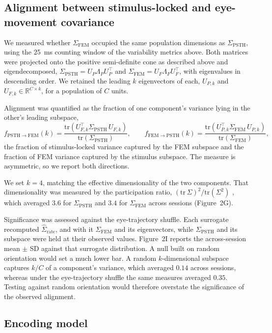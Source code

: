 \documentclass{lite}
\newcommand{\Cpsth}{\Sigma_{\text{PSTH}}}
\newcommand{\Cfem}{\Sigma_{\text{FEM}}}
\begin{document}
\subsection{Alignment between stimulus-locked and eye-movement covariance}
We measured whether $\Cfem$ occupied the same population dimensions as $\Cpsth$, using the 25~ms counting window of the variability metrics above. Both matrices were projected onto the positive semi-definite cone as described above and eigendecomposed, $\Cpsth = U_P \Lambda_P U_P^\top$ and $\Cfem = U_F \Lambda_F U_F^\top$, with eigenvalues in descending order. We retained the leading $k$ eigenvectors of each, $U_{P,k}$ and $U_{F,k} \in \mathbb{R}^{C \times k}$, for a population of $C$ units.

Alignment was quantified as the fraction of one component's variance lying in the other's leading subspace,
\begin{equation}
f_{\mathrm{PSTH}\to\mathrm{FEM}}(k)=\frac{\mathrm{tr}\!\left(U_{F,k}^\top \Cpsth\, U_{F,k}\right)}{\mathrm{tr}(\Cpsth)},\qquad
f_{\mathrm{FEM}\to\mathrm{PSTH}}(k)=\frac{\mathrm{tr}\!\left(U_{P,k}^\top \Cfem\, U_{P,k}\right)}{\mathrm{tr}(\Cfem)},
\end{equation}
the fraction of stimulus-locked variance captured by the FEM subspace and the fraction of FEM variance captured by the stimulus subspace. The measure is asymmetric, so we report both directions.

We set $k = 4$, matching the effective dimensionality of the two components. That dimensionality was measured by the participation ratio, $(\mathrm{tr}\,\Sigma)^2/\mathrm{tr}(\Sigma^2)$ \cite{pospisil2025revisiting}, which averaged $3.6$ for $\Cpsth$ and $3.4$ for $\Cfem$ across sessions (Figure~2G).

Significance was assessed against the eye-trajectory shuffle. Each surrogate recomputed $\hat{\Sigma}_{\mathrm{rate}}$, and with it $\Cfem$ and its eigenvectors, while $\Cpsth$ and its subspace were held at their observed values. Figure~2I reports the across-session mean $\pm$ SD against that surrogate distribution. A null built on random orientation would set a much lower bar. A random $k$-dimensional subspace captures $k/C$ of a component's variance, which averaged $0.14$ across sessions, whereas under the eye-trajectory shuffle the same measures averaged $0.35$. Testing against random orientation would therefore overstate the significance of the observed alignment.


\subsection{Encoding model}
\end{document}
